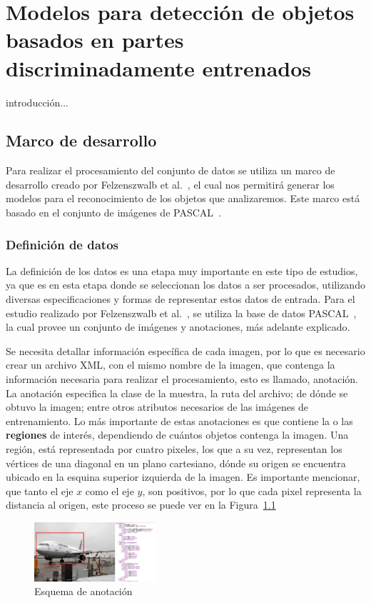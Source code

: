 \chapter[Modelos basados en partes ]{Modelos para detección de objetos basados en partes discriminadamente entrenados }\label{ch:framework}
introducción...

\section{Marco de desarrollo}
Para realizar el procesamiento del conjunto de datos se utiliza un marco de desarrollo creado por Felzenszwalb et al.~\cite{Felzenszwalb2010}, el cual nos permitirá generar los modelos para el reconocimiento de los objetos que analizaremos. Este marco está basado en el conjunto de imágenes de PASCAL~\cite{Everingham2010}.

\subsection{Definición de datos}
La definición de los datos es una etapa muy importante en este tipo de estudios, ya que es en esta etapa donde se seleccionan los datos a ser procesados, utilizando diversas especificaciones y formas de representar estos datos de entrada. Para el estudio realizado por Felzenszwalb et al.~\cite{Felzenszwalb2010}, se utiliza la base de datos PASCAL~\cite{Everingham2010}, la cual provee un conjunto de imágenes y anotaciones, más adelante explicado.

Se necesita detallar información específica de cada imagen, por lo que es necesario crear un archivo XML, con el mismo nombre de la imagen, que contenga la información necesaria para realizar el procesamiento, esto es llamado, anotación. La anotación especifica la clase de la muestra, la ruta del archivo; de dónde se obtuvo la imagen; entre otros atributos necesarios de las imágenes de entrenamiento. Lo más importante de estas anotaciones es que contiene la o las \textbf{regiones} de interés, dependiendo de cuántos objetos contenga la imagen. Una región, está representada por cuatro pixeles, los que a su vez, representan los vértices de una diagonal en un plano cartesiano, dónde su origen se encuentra ubicado en la esquina superior izquierda de la imagen. Es importante mencionar, que tanto el eje $x$ como el eje $y$, son positivos, por lo que cada pixel representa la distancia al origen, este proceso se puede ver en la Figura~\ref{fig:anota}

\begin{figure}[tb]
  \centering
   \includegraphics[width=0.4\textwidth]{Figuras/plain-1.jpg}
   \caption{Esquema de anotación}
   \label{fig:anota}
\end{figure}

